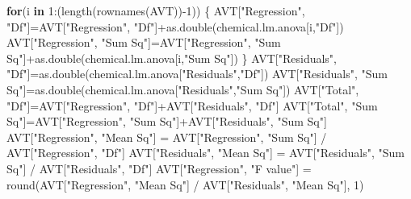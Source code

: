 \documentclass[
]{article}
\newenvironment{Shaded}{\begin{snugshade}}{\end{snugshade}}
\newcommand{\ControlFlowTok}[1]{\textcolor[rgb]{0.13,0.29,0.53}{\textbf{#1}}}
\newcommand{\DecValTok}[1]{\textcolor[rgb]{0.00,0.00,0.81}{#1}}
\newcommand{\FunctionTok}[1]{\textcolor[rgb]{0.00,0.00,0.00}{#1}}
\newcommand{\NormalTok}[1]{#1}
\newcommand{\OtherTok}[1]{\textcolor[rgb]{0.56,0.35,0.01}{#1}}
\newcommand{\SpecialCharTok}[1]{\textcolor[rgb]{0.00,0.00,0.00}{#1}}
\newcommand{\StringTok}[1]{\textcolor[rgb]{0.31,0.60,0.02}{#1}}
\begin{document}
\begin{Shaded}
\begin{Highlighting}[]
\ControlFlowTok{for}\NormalTok{(i }\ControlFlowTok{in} \DecValTok{1}\SpecialCharTok{:}\NormalTok{(}\FunctionTok{length}\NormalTok{(}\FunctionTok{rownames}\NormalTok{(AVT))}\SpecialCharTok{{-}}\DecValTok{1}\NormalTok{))}
\NormalTok{\{}
\NormalTok{  AVT[}\StringTok{"Regression"}\NormalTok{, }\StringTok{"Df"}\NormalTok{]}\OtherTok{=}\NormalTok{AVT[}\StringTok{"Regression"}\NormalTok{, }\StringTok{"Df"}\NormalTok{]}\SpecialCharTok{+}\FunctionTok{as.double}\NormalTok{(chemical.lm.anova[i,}\StringTok{"Df"}\NormalTok{])}
\NormalTok{  AVT[}\StringTok{"Regression"}\NormalTok{, }\StringTok{"Sum Sq"}\NormalTok{]}\OtherTok{=}\NormalTok{AVT[}\StringTok{"Regression"}\NormalTok{, }\StringTok{"Sum Sq"}\NormalTok{]}\SpecialCharTok{+}\FunctionTok{as.double}\NormalTok{(chemical.lm.anova[i,}\StringTok{"Sum Sq"}\NormalTok{])}
\NormalTok{\}}
\NormalTok{AVT[}\StringTok{"Residuals"}\NormalTok{, }\StringTok{"Df"}\NormalTok{]}\OtherTok{=}\FunctionTok{as.double}\NormalTok{(chemical.lm.anova[}\StringTok{"Residuals"}\NormalTok{,}\StringTok{"Df"}\NormalTok{])}
\NormalTok{AVT[}\StringTok{"Residuals"}\NormalTok{, }\StringTok{"Sum Sq"}\NormalTok{]}\OtherTok{=}\FunctionTok{as.double}\NormalTok{(chemical.lm.anova[}\StringTok{"Residuals"}\NormalTok{,}\StringTok{"Sum Sq"}\NormalTok{])}
\NormalTok{AVT[}\StringTok{"Total"}\NormalTok{, }\StringTok{"Df"}\NormalTok{]}\OtherTok{=}\NormalTok{AVT[}\StringTok{"Regression"}\NormalTok{, }\StringTok{"Df"}\NormalTok{]}\SpecialCharTok{+}\NormalTok{AVT[}\StringTok{"Residuals"}\NormalTok{, }\StringTok{"Df"}\NormalTok{]}
\NormalTok{AVT[}\StringTok{"Total"}\NormalTok{, }\StringTok{"Sum Sq"}\NormalTok{]}\OtherTok{=}\NormalTok{AVT[}\StringTok{"Regression"}\NormalTok{, }\StringTok{"Sum Sq"}\NormalTok{]}\SpecialCharTok{+}\NormalTok{AVT[}\StringTok{"Residuals"}\NormalTok{, }\StringTok{"Sum Sq"}\NormalTok{]}
\NormalTok{AVT[}\StringTok{"Regression"}\NormalTok{, }\StringTok{"Mean Sq"}\NormalTok{] }\OtherTok{=}\NormalTok{ AVT[}\StringTok{"Regression"}\NormalTok{, }\StringTok{"Sum Sq"}\NormalTok{] }\SpecialCharTok{/}\NormalTok{ AVT[}\StringTok{"Regression"}\NormalTok{, }\StringTok{"Df"}\NormalTok{]}
\NormalTok{AVT[}\StringTok{"Residuals"}\NormalTok{, }\StringTok{"Mean Sq"}\NormalTok{] }\OtherTok{=}\NormalTok{ AVT[}\StringTok{"Residuals"}\NormalTok{, }\StringTok{"Sum Sq"}\NormalTok{] }\SpecialCharTok{/}\NormalTok{ AVT[}\StringTok{"Residuals"}\NormalTok{, }\StringTok{"Df"}\NormalTok{]}
\NormalTok{AVT[}\StringTok{"Regression"}\NormalTok{, }\StringTok{"F value"}\NormalTok{] }\OtherTok{=} \FunctionTok{round}\NormalTok{(AVT[}\StringTok{"Regression"}\NormalTok{, }\StringTok{"Mean Sq"}\NormalTok{] }\SpecialCharTok{/}\NormalTok{ AVT[}\StringTok{"Residuals"}\NormalTok{, }\StringTok{"Mean Sq"}\NormalTok{], }\DecValTok{1}\NormalTok{)}

\end{Highlighting}
\end{Shaded}
\end{document}
